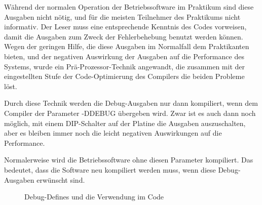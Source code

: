 Während der normalen Operation der Betriebssoftware im Praktikum sind diese Ausgaben
nicht nötig, und für die meisten Teilnehmer des Praktikums nicht informativ.
Der Leser muss eine entsprechende Kenntnis des Codes vorweisen, damit die Ausgaben
zum Zweck der Fehlerbehebung benutzt werden können.\\
Wegen der geringen Hilfe, die diese Ausgaben im Normalfall dem Praktikanten bieten,
und der negativen Auswirkung der Ausgaben auf die Performance des Systems, wurde
ein Prä-Prozessor-Technik angewandt, die zusammen mit der eingestellten Stufe der
Code-Optimierung des Compilers die beiden Probleme löst.

Durch diese Technik werden die Debug-Ausgaben nur dann kompiliert,
wenn dem Compiler der Parameter -DDEBUG übergeben wird. 
Zwar ist es auch dann noch möglich, mit einem DIP-Schalter auf der Platine die Ausgaben
auszuschalten, aber es bleiben immer noch die leicht negativen Auswirkungen auf die Performance.

Normalerweise
wird die Betriebssoftware ohne diesen Parameter kompiliert. Das bedeutet, dass die Software neu kompiliert werden muss, wenn
diese Debug-Ausgaben erwünscht sind.
\begin{figure}[htb]
 \centering
 \caption{\label{debug_trick}Debug-Defines und die Verwendung im Code}
\end{figure}

